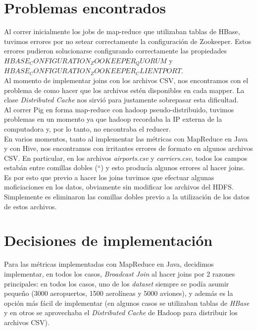 \documentclass[a4paper,10pt]{article}
\begin{document}
\setcounter{page}{1}

\section{Problemas encontrados}

Al correr inicialmente los jobs de map-reduce que utilizaban tablas de HBase, tuvimos errores por no setear correctamente la configuración de Zookeeper. Estos errores
pudieron solucionarse configurando correctamente las propiedades $HBASE_CONFIGURATION_ZOOKEEPER_QUORUM$ y $HBASE_CONFIGURATION_ZOOKEEPER_CLIENTPORT$.\\

Al momento de implementar joins con los archivos CSV, nos encontramos con el problema de como hacer que los archivos estén disponibles en cada mapper. La clase
\textit{Distributed Cache} nos sirvió para justamente sobrepasar esta dificultad.\\

Al correr Pig en forma map-reduce con hadoop pseudo-distribuido, tuvimos problemas en un momento ya que hadoop recordaba la IP externa de la computadora y,
por lo tanto, no encontraba el reducer.\\

En varios momentos, tanto al implementar las métricas con MapReduce en Java y con Hive, nos encontramos con irritantes errores de formato en algunos archivos CSV. En particular,
en los archivos \textit{airports.csv} y \textit{carriers.csv}, todos los campos estabán entre comillas dobles (``) y esto producía algunos errores al hacer joins. Es por esto que
previo a hacer los joins tuvimos que efectuar algunas moficiaciones en los datos, obviamente sin modificar los archivos del HDFS. Simplemente es eliminaron las comillas dobles
previo a la utilización de los datos de estos archivos.\\

\section{Decisiones de implementación}

Para las métricas implementadas con MapReduce en Java, decidimos implementar, en todos los casos, \textit{Broadcast Join} al hacer joins por 2 razones principales: en todos los casos,
uno de los \textit{dataset} siempre se podía asumir pequeño (3000 aeropuertos, 1500 aerolíneas y 5000 aviones), y además es la opción más fácil de implementar (en algunos casos se
utilizaban tablas de \textit{HBase} y en otros se aprovechaba el \textit{Distributed Cache} de Hadoop para distribuir los archivos CSV).\\
\end{document}
